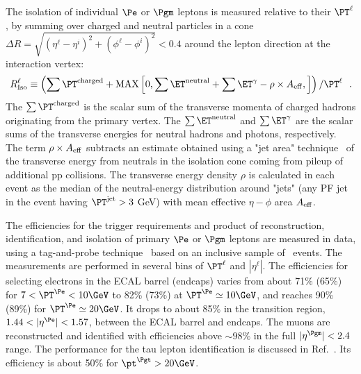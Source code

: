 The isolation of individual $\Pe$ or $\Pgm$ leptons is measured relative
to their 
$\PT^{\ell}$, by summing over charged and
neutral particles in a cone $\Delta R = \sqrt{(\eta^\ell - \eta^i)^{2}
+ (\phi^\ell- \phi^i)^{2}} < 0.4$ around the lepton direction at the
interaction vertex:
\begin{equation*}
R_{\rm Iso}^{\ell} \equiv \left( \sum  \PT^{\rm charged} + {\rm MAX}\left[ 0, \sum \ET^{\rm neutral} 
            +  \sum {\ET}^{\gamma} - \rho \times A_{\rm eff},  \right] \right) /  \PT^{\ell} ~~ .
\end{equation*}
The $\sum \PT^{\rm charged}$ is the scalar sum of the transverse
momenta of charged hadrons originating from the primary vertex.  
The $\sum \ET^{\rm neutral}$ and $\sum
{\ET}^{\gamma}$ are the scalar sums of the transverse energies for
neutral hadrons and photons, respectively.  
The term $\rho \times A_{\rm eff}$ subtracts an
estimate obtained using a "jet area" technique~\cite{Cacciari:2007fd}
of the transverse energy from neutrals in the isolation cone coming
from pileup of additional pp collisions.  The transverse energy
density $\rho$ is calculated in each event as the median of the
neutral-energy distribution around "jets" (any PF jet in the event
having $\PT^{\rm jet} > 3$ GeV) with mean effective $\eta-\phi$ area
$A_{\rm eff}$.  

The efficiencies for the trigger requirements and product of reconstruction, identification,
and isolation of primary $\Pe$ or $\Pgm$ leptons are measured in data,
using a tag-and-probe technique~\cite{CMS:2011aa} based on an
inclusive sample of \cPZ\ events.  The measurements are performed in
several bins of $\PT^{\ell} $ and $ |\eta^{\ell}| $.  The efficiencies for
selecting electrons in the ECAL barrel (endcaps) varies from about
71\% (65\%) for $7 < \PT^{\Pe} < 10\GeV$ to 82\% (73\%) at $\PT^{\Pe}
\simeq 10\GeV$, and reaches 90\% (89\%) for $\PT^{\Pe} \simeq 20\GeV$.
It drops to about 85\% in the transition region, $1.44 < |\eta^{\Pe}| <
1.57$, between the ECAL barrel and endcaps.  The muons are
reconstructed and identified with efficiencies above ${\sim}98\%$ in
the full $|\eta^{\Pgm}| < 2.4$ range.  The performance for the tau
lepton identification is discussed in Ref.~\cite{Chatrchyan:2011xq}.
Its efficiency is about 50\% for $\pt^\Pgt > 20\GeV$.
